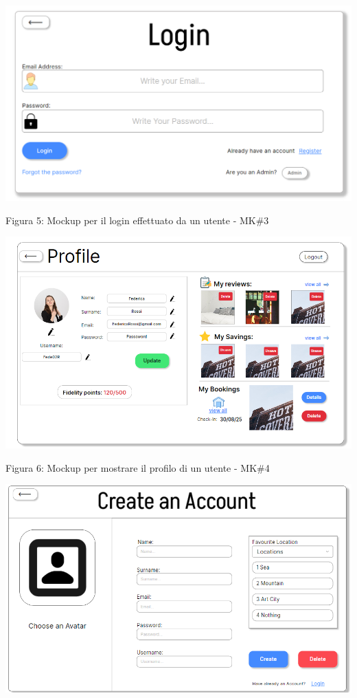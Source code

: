 \documentclass[10pt]{article}
\begin{document}
\begin{center}
\includegraphics[scale=0.5]{Mockup/MockupLogin}
\label{mk3}
\par\medskip
Figura 5: Mockup per il login effettuato da un utente - MK\#3
\par\medskip
{}
\includegraphics[scale=0.6]{Mockup/MockupProfile}
\label{mk4}
\par\medskip
Figura 6: Mockup per mostrare il profilo di un utente - MK\#4
\par\medskip
{}
\includegraphics[scale=0.6]{Mockup/MockupRegister}

\end{center}
\end{document}
